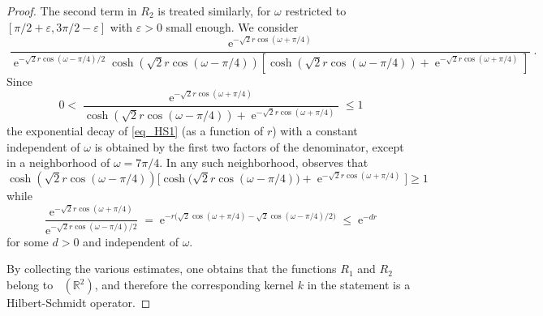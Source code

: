 \documentclass[10pt,a4paper]{amsart}
\def\R{\mathbb R}
\def\e{\mathop{\mathrm{e}}\nolimits}
\def\ltwo{\mathop{\mathrm{L}^2}\nolimits}
\begin{document}
\begin{proof}
The second term in $R_2$ is treated similarly, for $\omega$ restricted to $[\pi/2+\varepsilon,3\pi/2-\varepsilon]$ with  $\varepsilon>0$
small enough.  We consider
\begin{equation}\label{eq_HS1}
\frac{\e^{-\sqrt{2}r\cos(\omega+\pi/4)}}{\e^{-\sqrt{2}r\cos(\omega-\pi/4)/2}\cosh(\sqrt{2}r\cos(\omega-\pi/4))[\cosh(\sqrt{2}r\cos(\omega-\pi/4))+\e^{-\sqrt{2}r\cos(\omega+\pi/4)}]}.
\end{equation}
Since
$$
0<\frac{\e^{-\sqrt{2}r\cos(\omega+\pi/4)}}{\cosh(\sqrt{2}r\cos(\omega-\pi/4))+\e^{-\sqrt{2}r\cos(\omega+\pi/4)}}\leq 1
$$
the exponential decay of \eqref{eq_HS1} (as a function of $r$) with a constant independent of $\omega$ is obtained by the first two factors of the denominator, except in a neighborhood of $\omega=7\pi/4$. In any such neighborhood, observes that
$$
\cosh(\sqrt{2}r\cos(\omega-\pi/4))\big[\cosh\big(\sqrt{2}r\cos(\omega-\pi/4)\big)+\e^{-\sqrt{2}r\cos(\omega+\pi/4)}\big]\geq 1
$$
while 
$$
\frac{\e^{-\sqrt{2}r\cos(\omega+\pi/4)}}{\e^{-\sqrt{2}r\cos(\omega-\pi/4)/2}}
= \e^{-r\big(\sqrt{2}\cos(\omega+\pi/4)-\sqrt{2}\cos(\omega-\pi/4)/2\big)}\leq \e^{-dr}
$$
for some $d>0$ and independent of $\omega$.

By collecting the various estimates, one obtains that the functions $R_1$ and $R_2$ belong 
to $\ltwo(\R^2)$, and therefore the corresponding kernel $k$ in the statement is a Hilbert-Schmidt operator.
\end{proof}
\end{document}
